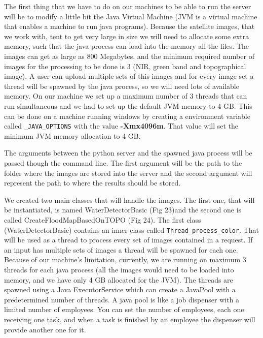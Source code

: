 \documentclass[12pt, a4paper]{report}
\begin{document}
\quad 
The first thing that we have to do on our machines to be able to run the server will be to modify a little bit the Java Virtual Machine (JVM is a virtual machine that enables a machine to run java programs). Because the satellite images, that we work with, tent to get very large in size we will need to allocate some extra memory, such that the java process can load into the memory all the files. The images can get as large as 800 Megabytes, and the minimum required number of images for the processing to be done is 3 (NIR, green band and topographical image). A user can upload multiple sets of this images and for every image set a thread will be spawned by the java process, so we will need lots of available memory. On our machine we set up a maximum number of 3 threads that can run simultaneous and we had to set up the default JVM memory to 4 GB. This can be done on a machine running windows by  creating a environment variable called \texttt{\_JAVA\_OPTIONS} with the value \textbf{-Xmx4096m}. That value will set the minimum JVM memory allocation to 4 GB.
\par 

The arguments between the python server and the spawned java process will be passed though the command line. The first argument will be the path to the folder where the images are stored into the server and the second argument will represent the path to where the results should be stored.
\par 

We created two main classes that will handle the images. The first one, that will be instantiated, is named WaterDetectorBasic (Fig 23)and the second one is called CreateFloodMapBasedOnTOPO (Fig 24). The first class (WaterDetectorBasic) contains an inner class called \texttt{Thread\_process\_color}. That will be used as a thread to process every set of images contained in a request. If an input has multiple sets of images a thread will be spawned for each one. Because of our machine's limitation, currently, we are running on maximum 3 threads for each java process (all the images would need to be loaded into memory, and we have only 4 GB allocated for the JVM). The threads are spawned using a Java ExecutorService which can create a JavaPool with a predetermined number of threads. A java pool is like a job dispenser with a limited number of employees. You can set the number of employees, each one receiving one task, and when a task is finished by an employee the dispenser will provide another one for it.
\end{document}
